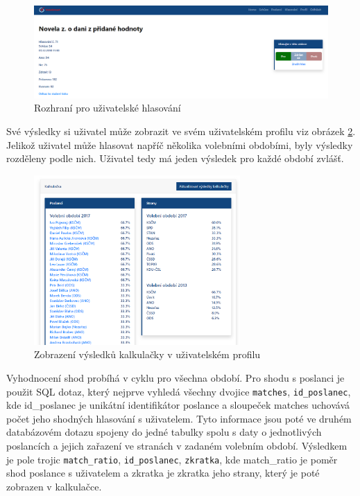 \begin{figure}
    \centering
    \includegraphics[width=1\textwidth]{obrazky-figures/aplikace-hlasovani.png}
    \caption{Rozhraní pro uživatelské hlasování}
    \label{fig:aplikace-hlasovani}
\end{figure}

\par Své výsledky si uživatel může zobrazit ve svém uživatelském profilu viz obrázek \ref{fig:aplikace-kalkulacka}. Jelikož uživatel může hlasovat napříč několika volebními obdobími, byly výsledky rozděleny podle nich. Uživatel tedy má jeden výsledek pro každé období zvlášť. 

\begin{figure}[H]
    \centering
    \includegraphics[width=0.7\textwidth]{obrazky-figures/aplikace-kalkulacka.png}
    \caption{Zobrazení výsledků kalkulačky v uživatelském profilu}
    \label{fig:aplikace-kalkulacka}
\end{figure}

\par Vyhodnocení shod probíhá v cyklu pro všechna období. Pro shodu s poslanci je použit SQL dotaz, který nejprve vyhledá všechny dvojice \texttt{matches}, \texttt{id\_poslanec}, kde id\_poslanec je unikátní identifikátor poslance a sloupeček matches uchovává počet jeho shodných hlasování s uživatelem. Tyto informace jsou poté ve druhém databázovém dotazu spojeny do jedné tabulky spolu s daty o jednotlivých poslancích a jejich zařazení ve stranách v zadaném volebním období. Výsledkem je pole trojic \texttt{match\_ratio}, \texttt{id\_poslanec}, \texttt{zkratka}, kde match\_ratio je poměr shod poslance s uživatelem a zkratka je zkratka jeho strany, který je poté zobrazen v kalkulačce.

